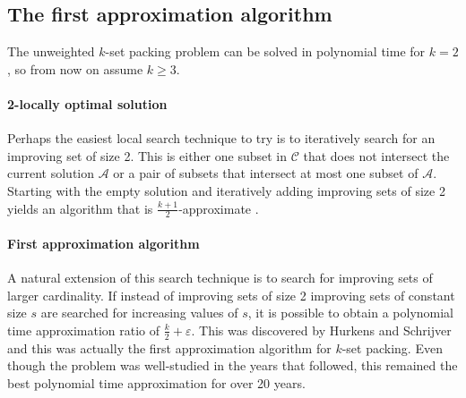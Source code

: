 \subsection{The first approximation algorithm}\label{subsec:HurkensSchrijver}

The unweighted $k$-set packing problem can be solved in polynomial time for $k=2$ \cite{Minty}, so from now on assume $k \geq 3$.

\paragraph{2-locally optimal solution} Perhaps the easiest local search technique to try is to iteratively search for an improving set of size 2. This is either one subset in $\mathcal{C}$ that does not intersect the current solution $\mathcal{A}$ or a pair of subsets that intersect at most one subset of $\mathcal{A}$. Starting with the empty solution and iteratively adding improving sets of size 2 yields an algorithm that is $\frac{k+1}{2}$-approximate \cite{Weighted2,Halldorsson}.

\paragraph{First approximation algorithm} A natural extension of this search technique is to search for improving sets of larger cardinality. If instead of improving sets of size 2 improving sets of constant size $s$ are searched for increasing values of $s$, it is possible to obtain a polynomial time approximation ratio of $\frac{k}{2} + \varepsilon$. This was discovered by Hurkens and Schrijver \cite{HurkensSchrijver} and this was actually the first approximation algorithm for $k$-set packing. %
Even though the problem was well-studied in the years that followed, this remained the best polynomial time approximation for over 20 years.


